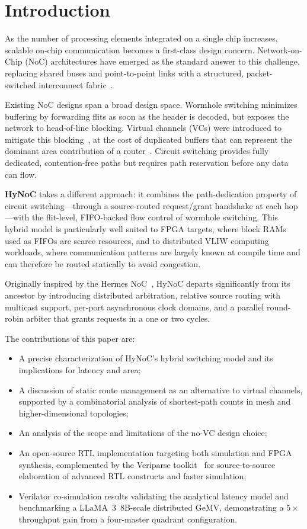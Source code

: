 \section{Introduction}
\label{sec:introduction}

As the number of processing elements integrated on a single chip increases,
scalable on-chip communication becomes a first-class design concern.
Network-on-Chip (NoC) architectures have emerged as the standard answer to this
challenge, replacing shared buses and point-to-point links with a structured,
packet-switched interconnect fabric~\cite{dally2001}.

Existing NoC designs span a broad design space. Wormhole switching minimizes
buffering by forwarding flits as soon as the header is decoded, but exposes the
network to head-of-line blocking. Virtual channels (VCs) were introduced to
mitigate this blocking~\cite{dally1992}, at the cost of duplicated buffers that
can represent the dominant area contribution of a router~\cite{mello2005}. Circuit
switching provides fully dedicated, contention-free paths but requires path
reservation before any data can flow.

\textbf{HyNoC} takes a different approach: it combines the path-dedication
property of circuit switching---through a source-routed request/grant handshake at
each hop---with the flit-level, FIFO-backed flow control of wormhole switching.
This hybrid model is particularly well suited to FPGA targets, where block RAMs
used as FIFOs are scarce resources, and to distributed VLIW computing workloads,
where communication patterns are largely known at compile time and can therefore be
routed statically to avoid congestion.

Originally inspired by the Hermes NoC~\cite{moraes2004}, HyNoC departs
significantly from its ancestor by introducing distributed arbitration, relative
source routing with multicast support, per-port asynchronous clock domains, and a
parallel round-robin arbiter that grants requests in a one or two cycles.

The contributions of this paper are:
\begin{itemize}
  \item A precise characterization of HyNoC's hybrid switching model and its
        implications for latency and area;
  \item A discussion of static route management as an alternative to virtual
        channels, supported by a combinatorial analysis of shortest-path counts
        in mesh and higher-dimensional topologies;
  \item An analysis of the scope and limitations of the no-VC design choice;
  \item An open-source RTL implementation targeting both simulation and FPGA
        synthesis, complemented by the Veriparse toolkit~\cite{veriparse} for
        source-to-source elaboration of advanced RTL constructs and faster
        simulation;
  \item Verilator co-simulation results validating the analytical latency model
        and benchmarking a LLaMA~3~8B-scale distributed GeMV, demonstrating a
        $5\times$ throughput gain from a four-master quadrant configuration.
\end{itemize}

